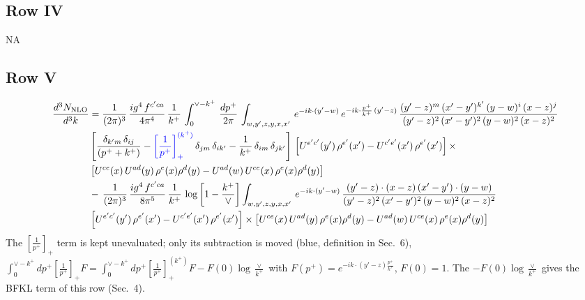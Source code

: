 \documentclass[9pt]{article}
\newcommand{\new}[1]{{\color{blue}#1}}
\numberwithin{equation}{section}
\begin{document}
\subsection{Row IV}
\textsc{NA}
\subsection{Row V}
\begin{align}
    \frac{d^{3}N_{\rm NLO}}{d^{3}k} & = \frac{1}{(2\pi)^{3}}\, \frac{ig^{4}\,f^{c'ca}}{4\pi^{4}}\, \frac{1}{k^{+}}\,\int_{0}^{\vee-k^{+}}\, \frac{dp^{+}}{2\pi}\, \int_{w,y',z,y,x,x'}\, e^{-ik\cdot (y'-w)}\, e^{-ik\cdot \frac{p^{+}}{k^{+}}\,(y'-z)}\,\frac{(y'-z)^{m}\,(x'-y')^{k'}\,(y-w)^{i}\,(x-z)^{j}}{(y'-z)^{2}\,(x'-y')^{2}\,(y-w)^{2}\,(x-z)^{2}}\notag \\ & \left[\frac{\delta_{k'm}\,\delta_{ij}}{(p^{+}+k^{+})}-\new{\left[\frac{1}{p^{+}}\right]_{+}^{(k^{+})}}\,\delta_{jm}\,\delta_{ik'}-\frac{1}{k^{+}}\, \delta_{im}\, \delta_{jk'}\right]\, \left[U^{e'c'}(y')\,\rho^{e'}(x')-U^{c'e'}(x')\,\rho^{e'}(x')\right]\times \notag \\ &  \left[U^{ce}(x)\,U^{ad}(y)\,\rho^{e}(x)\rho^{d}(y)-U^{ad}(w)\,U^{ce}(x)\,\rho^{e}(x)\rho^{d}(y)\right]\notag \\ & -\,\frac{1}{(2\pi)^{3}}\, \frac{ig^{4}\,f^{c'ca}}{8\pi^{5}}\, \frac{1}{k^{+}}\, \log{\left[1-\frac{k^{+}}{\vee}\right]} \int_{w,y',z,y,x,x'}\, e^{-ik\cdot (y'-w)}\,\frac{(y'-z)\cdot (x-z)\,(x'-y')\cdot (y-w)}{(y'-z)^{2}\,(x'-y')^{2}\,(y-w)^{2}\,(x-z)^{2}}\notag \\ & \left[U^{e'c'}(y')\,\rho^{e'}(x')-U^{c'e'}(x')\,\rho^{e'}(x')\right]\times  \left[U^{ce}(x)\,U^{ad}(y)\,\rho^{e}(x)\rho^{d}(y)-U^{ad}(w)\,U^{ce}(x)\,\rho^{e}(x)\rho^{d}(y)\right]
\end{align}
\new{The $\left[\frac{1}{p^+}\right]_+$ term is kept unevaluated; only its subtraction is moved (blue, definition in Sec.~6), $\int_0^{\vee-k^+}dp^+\left[\frac{1}{p^+}\right]_+F=\int_0^{\vee-k^+}dp^+\left[\frac{1}{p^+}\right]_+^{(k^+)}F-F(0)\log\frac{\vee}{k^+}$ with $F(p^+)=e^{-ik\cdot(y'-z)\frac{p^+}{k^+}}$, $F(0)=1$. The $-F(0)\log\frac{\vee}{k^+}$ gives the BFKL term of this row (Sec.~4).}
\end{document}
